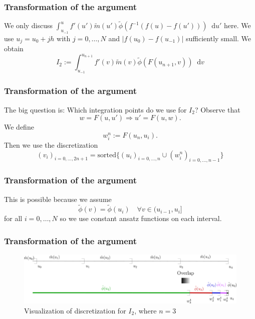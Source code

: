 \documentclass[12pt,a4paper,handout]{beamer}
\theoremstyle{definition}
\theoremstyle{plain}
\newcommand{\abs}[1]{\left\vert #1\right\vert}
\newcommand{\D}{\mathop{}\!\mathrm{d}}
\begin{document}
\begin{frame}
    \frametitle{Transformation of the argument}
    We only discuss $\int_{u_{-1}}^{u}f'(u')\tilde{m}(u')\tilde{\phi}(f^{-1}(f(u)-f(u')))\D u'$ here. We use $u_j=u_0+jh$ with $j=0,\dotsc,N$ and $\abs{f(u_0)-f(u_{-1})}$ sufficiently small. We obtain
    \begin{equation*}
        I_2:=\int_{u_{-1}}^{u_{n+1}}f'(v)\tilde{m}(v)\tilde{\phi}(F(u_{n+1},v))\D v
    \end{equation*}
\end{frame}
\begin{frame}
    \frametitle{Transformation of the argument}
    The big question is: Which integration points do we use for $I_2$? Observe that
    \begin{equation*}
        w=F(u,u')\Rightarrow u'=F(u,w).
    \end{equation*}
    We define 
    \begin{equation*}
        w_{i}^{n}:=F(u_n,u_i).
    \end{equation*}
    Then we use the discretization 
    \begin{equation*}
        (v_i)_{i=0,\dotsc,2n+1}=\text{sorted}\{(u_i)_{i=0,\dotsc,n}\cup (w^n_{i})_{i=0,\dotsc,n-1}\}
    \end{equation*}
\end{frame}
\begin{frame}
    \frametitle{Transformation of the argument}
    This is possible because we assume
    \begin{equation*}
        \tilde\phi(v)=\tilde{\phi}(u_i)\quad\forall v\in (u_{i-1},u_i]
    \end{equation*}
    for all $i=0,\dotsc,N$ so we use constant ansatz functions on each interval.
\end{frame}
\begin{frame}
\frametitle{Transformation of the argument}
    \begin{figure}
        \centering
        \includegraphics[width=\textwidth]{Tranformls1}
        \caption{Visualization of discretization for $I_2$, where $n=3$}
        \label{fig:vis1}
    \end{figure}
\end{frame}
\end{document}

